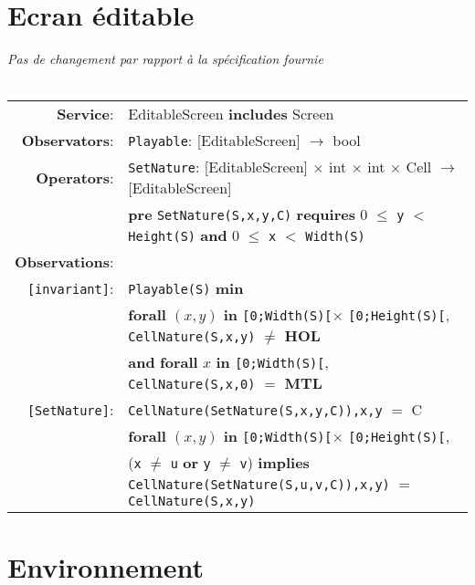 \documentclass[7pt]{article}
\begin{document}
\section*{Ecran éditable}
\textit{Pas de changement par rapport à la spécification fournie} \\ \\
\begin{tabular}{rl}
\textbf{Service}: & \textrm{EditableScreen} {\bf includes} \textrm{Screen}  \\
\textbf{Observators}: & \texttt{Playable}: \textrm{[EditableScreen]} $\rightarrow$ \textrm{bool} \\
\textbf{Operators}: & \texttt{SetNature}: \textrm{[EditableScreen]} $\times$ \textrm{int} $\times$ \textrm{int} $\times$ \textrm{Cell}  $\rightarrow$ \textrm{[EditableScreen]} \\
& \quad \textbf{pre } \texttt{SetNature(S,x,y,C)} \textbf{ requires } 0 $\leq$ \texttt{y} $<$ \texttt{Height(S)} \textbf{ and } 0 $\leq$ \texttt{x} $<$ \texttt{Width(S)}\\
\textbf{Observations}: \\
\texttt{[invariant]}: & \texttt{Playable(S)} \textbf{min} \\
& \quad\quad\quad\quad \textbf{forall} $(x,y)$ \textbf{in} \texttt{[0;Width(S)[}$\times$ \texttt{[0;Height(S)[}, \texttt{CellNature(S,x,y)} $\neq$ \textbf{HOL}  \\
& \quad\quad\quad\quad \textbf{and} \textbf{forall} $x$ \textbf{in} \texttt{[0;Width(S)[}, \texttt{CellNature(S,x,0)} $=$ \textbf{MTL}  \\
\texttt{[SetNature]}: & \texttt{CellNature(SetNature(S,x,y,C)),x,y} $=$ C \\
        & \textbf{forall} $(x,y)$ \textbf{in} \texttt{[0;Width(S)[}$\times$ \texttt{[0;Height(S)[}, \\ & \quad\quad\quad\quad (\texttt{x} $\neq$ \texttt{u} \textbf{or} \texttt{y} $\neq$ \texttt{v}) \textbf{implies} \texttt{CellNature(SetNature(S,u,v,C)),x,y)} $=$ \texttt{CellNature(S,x,y)} \\
\end{tabular}

\section*{Environnement}
\end{document}

